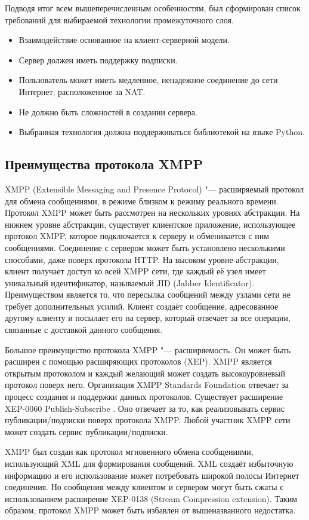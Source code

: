 Подводя итог всем вышеперечисленным особенностям, был сформирован список
требований для выбираемой технологии промежуточного слоя.
\begin{itemize}
\item Взаимодействие основанное на клиент-серверной модели.
\item Сервер должен иметь поддержку подписки.
\item Пользователь может иметь медленное, ненадежное соединение до
сети Интернет, расположенное за NAT.
\item Не должно быть сложностей в создании сервера.
\item Выбранная технология должна поддерживаться библиотекой на языке
Python.
\end{itemize}

\subsection{Преимущества протокола XMPP}

XMPP (Extensible Messaging and Presence Protocol) "--- расширяемый протокол для
обмена сообщениями, в режиме близком к режиму реального времени. Протокол XMPP
может быть рассмотрен на нескольких уровнях абстракции. На нижнем уровне
абстракции, существует клиентское приложение, использующее протокол XMPP,
которое подключается к серверу и обменивается с ним сообщениями. Соединение с
сервером может быть установлено несколькими способами, даже поверх протокола
HTTP. На высоком уровне абстракции, клиент получает доступ ко всей XMPP сети,
где каждый её узел имеет уникальный идентификатор, называемый JID (Jabber
Identificator). Преимуществом является то, что пересылка сообщений между узлами
сети не требует дополнительных усилий. Клиент создаёт сообщение, адресованное
другому клиенту и посылает его на сервер, который отвечает за все операции,
связанные с доставкой данного сообщения.

Большое преимущество протокола XMPP "--- расширяемость. Он может быть расширен с
помощью расширяющих протоколов (XEP). XMPP является открытым протоколом и каждый
желающий может создать высокоуровневый протокол поверх него. Организация XMPP
Standards Foundation отвечает за процесс создания и поддержки данных протоколов.
Существует расширение XEP-0060 Publish-Subscribe \cite{xep-0060}. Оно отвечает
за то, как реализовывать сервис публикации/подписки поверх протокола XMPP. Любой
участник XMPP сети может создать сервис публикации/подписки.

XMPP был создан как протокол мгновенного обмена сообщениями, использующий XML
для формирования сообщений. XML создаёт избыточную информацию и его
использование может потребовать широкой полосы Интернет соединения. Но сообщения
между клиентом и сервером могут быть сжаты с использованием расширение XEP-0138
(Stream Compression extension). Таким образом, протокол XMPP может быть избавлен
от вышеназванного недостатка.

